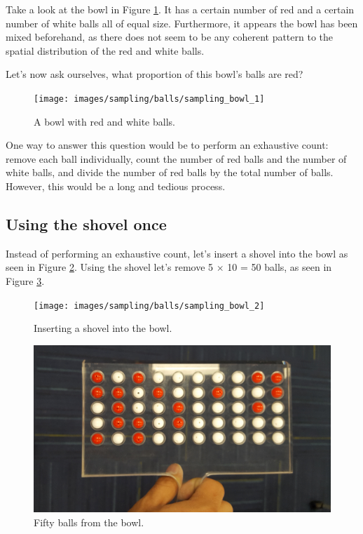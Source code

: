 \documentclass[
]{book}
\begin{document}
Take a look at the bowl in Figure \ref{fig:sampling-exercise-1}. It has a certain number of red and a certain number of white balls all of equal size. Furthermore, it appears the bowl has been mixed beforehand, as there does not seem to be any coherent pattern to the spatial distribution of the red and white balls.

Let's now ask ourselves, what proportion of this bowl's balls are red?

\begin{figure}
\texttt{[image: images/sampling/balls/sampling\_bowl\_1]} \caption{A bowl with red and white balls.}\label{fig:sampling-exercise-1}
\end{figure}

One way to answer this question would be to perform an exhaustive count: remove each ball individually, count the number of red balls and the number of white balls, and divide the number of red balls by the total number of balls. However, this would be a long and tedious process.

\hypertarget{using-the-shovel-once}{%
\subsection{Using the shovel once}\label{using-the-shovel-once}}

Instead of performing an exhaustive count, let's insert a shovel into the bowl as seen in Figure \ref{fig:sampling-exercise-2}. Using the shovel let's remove 5 \(\times\) 10 = 50 balls, as seen in Figure \ref{fig:sampling-exercise-3}.

\begin{figure}
\texttt{[image: images/sampling/balls/sampling\_bowl\_2]} \caption{Inserting a shovel into the bowl.}\label{fig:sampling-exercise-2}
\end{figure}

\begin{figure}
\includegraphics[width=0.8\linewidth]{images/sampling/balls/sampling_bowl_3_cropped} \caption{Fifty balls from the bowl.}\label{fig:sampling-exercise-3}
\end{figure}
\end{document}
